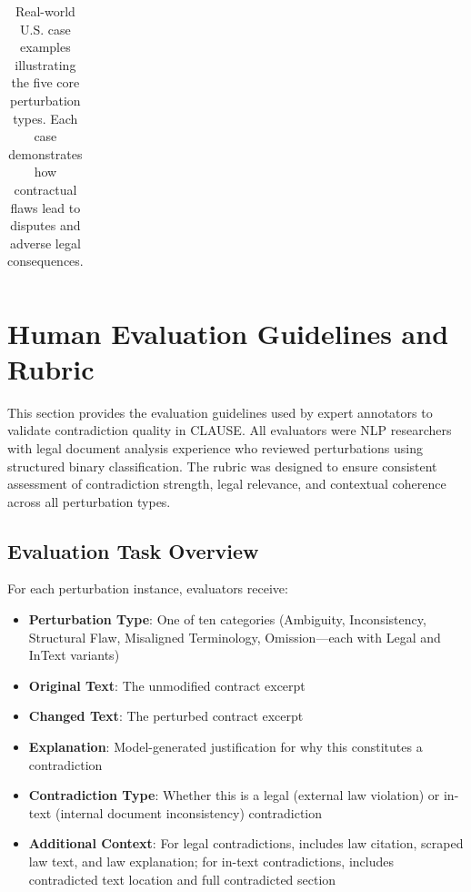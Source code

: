 \documentclass[11pt]{article}
\newcommand{\datasetName}{{\sc CLAUSE}\xspace}
\begin{document}
\begin{table}[h!]
\begin{tabular}{|>{\centering\arraybackslash}m{1.8cm}|>{\centering\arraybackslash}m{3.8cm}|>{\centering\arraybackslash}m{2.8cm}|>{\centering\arraybackslash}m{3.5cm}|>{\centering\arraybackslash}m{3cm}|}
\hline
\end{tabular}
\caption{\small Real-world U.S. case examples illustrating the five core perturbation types. Each case demonstrates how contractual flaws lead to disputes and adverse legal consequences.}
\label{tab:contractual_pitfalls}
\end{table}

\section{Human Evaluation Guidelines and Rubric}
\label{sec:human-evaluation-rubric}

This section provides the evaluation guidelines used by expert annotators to validate contradiction quality in \datasetName. All evaluators were NLP researchers with legal document analysis experience who reviewed perturbations using structured binary classification. The rubric was designed to ensure consistent assessment of contradiction strength, legal relevance, and contextual coherence across all perturbation types.

\subsection{Evaluation Task Overview}

For each perturbation instance, evaluators receive:
\begin{itemize}[leftmargin=*,itemsep=0.1em]
    \item \textbf{Perturbation Type}: One of ten categories (Ambiguity, Inconsistency, Structural Flaw, Misaligned Terminology, Omission—each with Legal and InText variants)
    \item \textbf{Original Text}: The unmodified contract excerpt
    \item \textbf{Changed Text}: The perturbed contract excerpt
    \item \textbf{Explanation}: Model-generated justification for why this constitutes a contradiction
    \item \textbf{Contradiction Type}: Whether this is a legal (external law violation) or in-text (internal document inconsistency) contradiction
    \item \textbf{Additional Context}: For legal contradictions, includes law citation, scraped law text, and law explanation; for in-text contradictions, includes contradicted text location and full contradicted section
\end{itemize}
\end{document}
